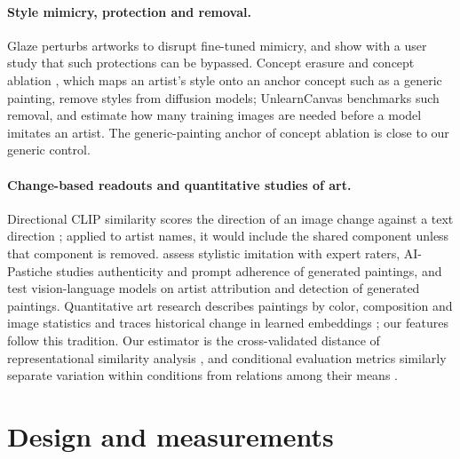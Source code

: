 \documentclass[10pt]{article}
\begin{document}
\paragraph{Style mimicry, protection and removal.}
Glaze \citep{shan2023glaze} perturbs artworks to disrupt fine-tuned mimicry, and
\citet{honig2025adversarial} show with a user study that such protections can be bypassed.
Concept erasure \citep{gandikota2023erasing} and concept ablation \citep{kumari2023ablating},
which maps an artist's style onto an anchor concept such as a generic painting, remove styles
from diffusion models; UnlearnCanvas \citep{zhang2024unlearncanvas} benchmarks such removal, and
\citet{verma2025imitation} estimate how many training images are needed before a model imitates
an artist. The generic-painting anchor of concept ablation is close to our generic control.

\paragraph{Change-based readouts and quantitative studies of art.}
Directional CLIP similarity scores the direction of an image change against a text direction
\citep{gal2022stylegannada,brooks2023instructpix2pix}; applied to artist names, it would include
the shared component unless that component is removed. \citet{deliege2025} assess stylistic
imitation with expert raters, AI-Pastiche \citep{asperti2025pastiche} studies authenticity and
prompt adherence of generated paintings, and \citet{fu2025aiwikiart} test vision-language models
on artist attribution and detection of generated paintings. Quantitative art research describes
paintings by color, composition and image statistics \citep{kim2014,sigaki2018,lee2020} and
traces historical change in learned embeddings \citep{kim2026}; our features follow this
tradition. Our estimator is the cross-validated distance of representational similarity analysis
\citep{diedrichsen2017representational}, and conditional evaluation metrics similarly separate
variation within conditions from relations among their means \citep{naeem2020,benny2021conditional}.

\section{Design and measurements}\label{sec:design}
\end{document}

